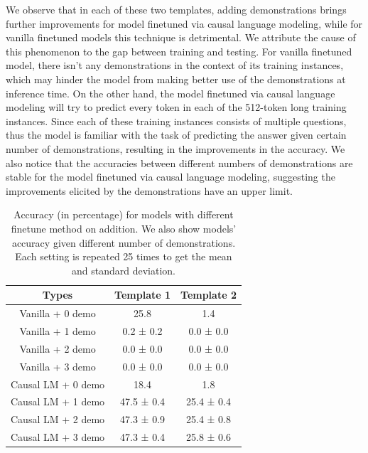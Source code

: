 
We observe that in each of these two templates, adding demonstrations brings further improvements for model finetuned via causal language modeling, while for vanilla finetuned models this technique is detrimental. We attribute the cause of this phenomenon to the gap between training and testing. For vanilla finetuned model, there isn't any demonstrations in the context of its training instances, which may hinder the model from making better use of the demonstrations at inference time. On the other hand, the model finetuned via causal language modeling will try to predict every token in each of the 512-token long training instances. Since each of these training instances consists of multiple questions, thus the model is familiar with the task of predicting the answer given certain number of demonstrations, resulting in the improvements in the accuracy. We also notice that the accuracies between different numbers of demonstrations are stable for the model finetuned via causal language modeling, suggesting the improvements elicited by the demonstrations have an upper limit.

\begin{table}[h]
\begin{center}
\begin{small}
\begin{tabular}{ccc}
Types              & Template 1 & Template 2 \\
\toprule
Vanilla + 0 demo   & 25.8       & 1.4        \\
Vanilla + 1 demo   & 0.2 ± 0.2  & 0.0 ± 0.0  \\
Vanilla + 2 demo   & 0.0 ± 0.0  & 0.0 ± 0.0  \\
Vanilla + 3 demo   & 0.0 ± 0.0  & 0.0 ± 0.0  \\
\midrule
Causal LM + 0 demo & 18.4       & 1.8        \\
Causal LM + 1 demo & 47.5 ± 0.4 & 25.4 ± 0.4 \\
Causal LM + 2 demo & 47.3 ± 0.9 & 25.4 ± 0.8 \\
Causal LM + 3 demo & 47.3 ± 0.4 & 25.8 ± 0.6
\end{tabular}
\caption{\label{tbl:overall_res} Accuracy (in percentage) for models with different finetune method on addition. We also show models' accuracy given different number of demonstrations. Each setting is repeated 25 times to get the mean and standard deviation.}
\end{small}
\end{center}
\end{table}


